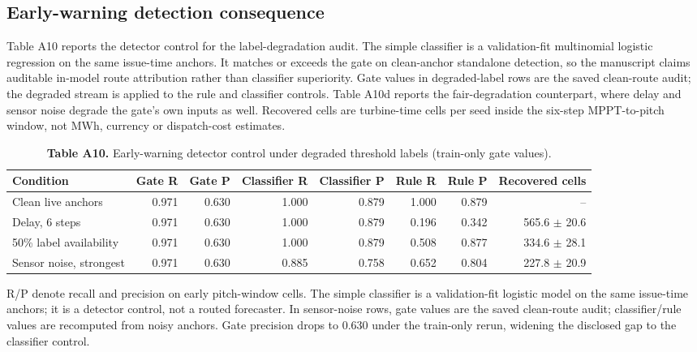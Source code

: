 \documentclass[
  journal]{IEEEtran}
\begin{document}
\subsection*{Early-warning detection
consequence}\label{early-warning-detection-consequence}

Table A10 reports the detector control for the label-degradation audit.
The simple classifier is a validation-fit multinomial logistic
regression on the same issue-time anchors. It matches or exceeds the
gate on clean-anchor standalone detection, so the manuscript claims
auditable in-model route attribution rather than classifier superiority.
Gate values in degraded-label rows are the saved clean-route audit; the
degraded stream is applied to the rule and classifier controls. Table
A10d reports the fair-degradation counterpart, where delay and sensor
noise degrade the gate's own inputs as well. Recovered cells are
turbine-time cells per seed inside the six-step MPPT-to-pitch window,
not MWh, currency or dispatch-cost estimates.

\begin{table}[!t]
\centering
\fontsize{8.0pt}{9.6pt}\selectfont
\setlength{\tabcolsep}{2pt}
\renewcommand{\arraystretch}{1.05}
\caption*{\textbf{Table A10.} Early-warning detector control under degraded threshold labels (train-only gate values).}
%
\begin{tabular}{lrrrrrrr}
\toprule
Condition & Gate R & Gate P & Classifier R & Classifier P & Rule R & Rule P & Recovered cells \\
\midrule
Clean live anchors & 0.971 & 0.630 & 1.000 & 0.879 & 1.000 & 0.879 & -- \\
Delay, 6 steps & 0.971 & 0.630 & 1.000 & 0.879 & 0.196 & 0.342 & 565.6 $\pm$ 20.6 \\
50\% label availability & 0.971 & 0.630 & 1.000 & 0.879 & 0.508 & 0.877 & 334.6 $\pm$ 28.1 \\
Sensor noise, strongest & 0.971 & 0.630 & 0.885 & 0.758 & 0.652 & 0.804 & 227.8 $\pm$ 20.9 \\
\bottomrule
\end{tabular}
\vspace{1mm}
\fontsize{8.0pt}{9.6pt}\selectfont R/P denote recall and precision on early pitch-window cells. The simple classifier is a validation-fit logistic model on the same issue-time anchors; it is a detector control, not a routed forecaster. In sensor-noise rows, gate values are the saved clean-route audit; classifier/rule values are recomputed from noisy anchors. Gate precision drops to 0.630 under the train-only rerun, widening the disclosed gap to the classifier control.
\end{table}
\end{document}
